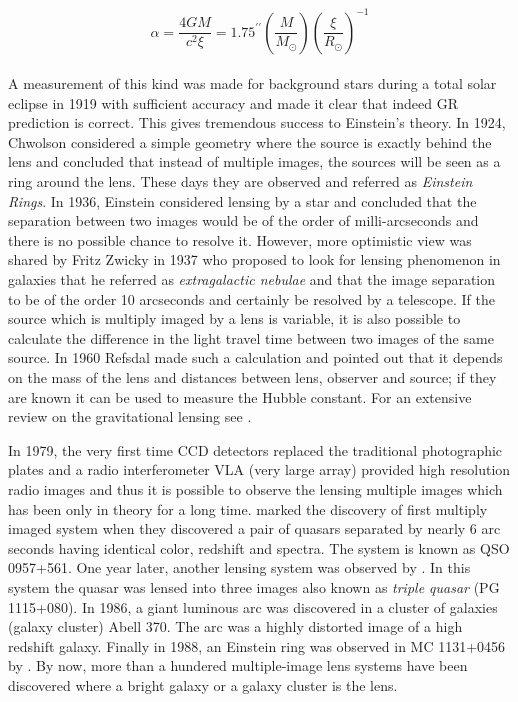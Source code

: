 \begin{equation}
	\hat{\alpha} = \dfrac{4GM}{c^2 \xi} = 1.75^{\prime \prime} 
					\left(\dfrac{M}{M_{\odot}}\right)
					\left(\dfrac{\xi}{R_{\odot}} \right)^{-1}
\end{equation}
\\
A measurement of this kind was made for background stars during a total solar eclipse
in 1919 with sufficient accuracy and made it clear that indeed GR prediction is 
correct. This gives tremendous success to Einstein's theory. In 1924, Chwolson
considered a simple geometry where the source is exactly behind the lens
and concluded that instead of multiple images, the sources will be seen
as a ring around the lens. These days they are observed and referred as {\it Einstein Rings}.
In 1936, Einstein
considered lensing by a star and concluded that the separation between two images
would be of the order of milli-arcseconds and there is no possible chance to
resolve it. However, more optimistic view was shared by Fritz Zwicky in 1937 who
proposed to look for lensing phenomenon in galaxies that he referred as 
{\it extragalactic nebulae} and that the image separation to be of the order 10 arcseconds
and certainly be resolved by a telescope. If the source which is multiply imaged
by a lens is variable, it is also possible to calculate the difference 
in the light travel time between two images of the same source. In 1960 Refsdal
made such a calculation and pointed out that it depends on the mass of the lens
and distances between lens, observer and source; if they are known it can be 
used to measure the Hubble constant. For an extensive review on the gravitational
lensing see \citep{1992grle.book.....S,2001stgl.book.....P,2006glsw.conf.....M}.


In 1979, the very first time CCD detectors replaced the traditional photographic
plates and a radio interferometer VLA (very large array) provided high resolution 
radio images and thus it is possible to observe the lensing multiple images
which has been only in theory for a long time. \cite{1979Natur.279..381W} marked
the discovery of first multiply imaged system when they discovered a pair of quasars
separated by nearly 6 arc seconds having identical color, redshift and spectra. The
system is known as QSO 0957+561. One year later, another lensing system was observed
by \cite{1980Natur.285..641W}. In this system the quasar was lensed into three
images also known as {\it triple quasar} (PG 1115+080). In 1986, a giant luminous
arc was discovered in a cluster of galaxies (galaxy cluster) Abell 370. The arc
was a highly distorted image of a high redshift galaxy. Finally in 1988, an Einstein
ring was observed in MC 1131+0456 by \cite{1988Natur.333..537H}. By now, more than 
a hundered multiple-image lens systems have been discovered where a bright galaxy
or a galaxy cluster is the lens. 


